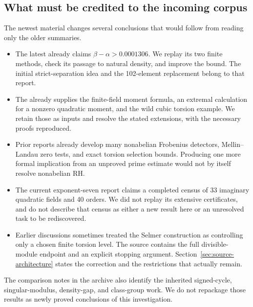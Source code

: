 \subsection{What must be credited to the incoming corpus}
The newest material changes several conclusions that would follow from reading
only the older summaries.
\begin{itemize}
\item The latest 
already claims $\beta-\alpha>0.0001306$. We replay its two finite methods,
check its passage to natural density, and improve the bound. The initial
strict-separation idea and the 102-element replacement belong to that report.
\item The 
already supplies the finite-field moment formula, an extremal calculation for
a nonzero quadratic moment, and the wild cubic torsion example. We retain those
as inputs and resolve the stated extensions, with the necessary proofs reproduced.
\item Prior reports already develop many nonabelian Frobenius detectors,
Mellin--Landau zero tests, and exact torsion selection bounds. Producing one more
formal implication from an unproved prime estimate would not by itself resolve
nonabelian RH.
\item The current exponent-seven report claims a completed census of 33
imaginary quadratic fields and 40 orders. We did not replay its extensive
certificates, and do not describe that census as either a new result here or
an unresolved task to be rediscovered.
\item Earlier discussions sometimes treated the Selmer construction as controlling
only a chosen finite torsion level. The source contains the full divisible-module
endpoint and an explicit stopping argument. Section~\ref{sec:source-architecture}
states the correction and the restrictions that actually remain.
\end{itemize}
The comparison notes in the archive also identify the inherited signed-cycle,
singular-modulus, density-gap, and class-group work. We do not repackage those
results as newly proved conclusions of this investigation.
